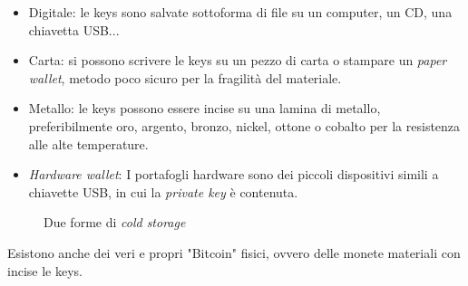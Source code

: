 \documentclass {article}
\begin{document}
\begin{itemize}
\item Digitale: le keys sono salvate sottoforma di file su un computer, un CD, una chiavetta USB...
\item Carta: si possono scrivere le keys su un pezzo di carta o stampare un \textit{paper wallet}, metodo poco sicuro per la fragilità del materiale.
\item Metallo: le keys possono essere incise su una lamina di metallo, preferibilmente oro, argento, bronzo, nickel, ottone o cobalto per la resistenza alle alte temperature.
\item \textit{Hardware wallet}: I portafogli hardware sono dei piccoli dispositivi simili a chiavette USB, in cui la \textit{private key} è contenuta.
\end{itemize}

\begin{figure}[htb!]

 
\caption{Due forme di \textit{cold storage}}

\end{figure}
\vspace {0.2cm}
\noindent
%
Esistono anche dei veri e propri "Bitcoin" fisici, ovvero delle monete materiali con incise le keys.
\end{document}
